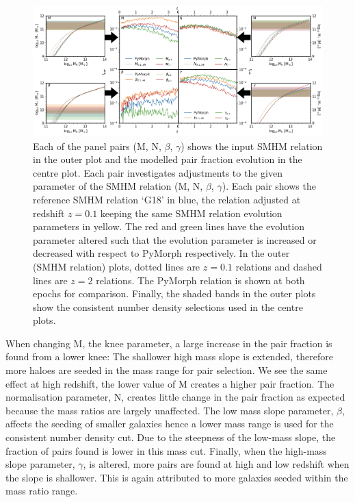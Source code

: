 \begin{landscape}
\begingroup
\begin{figure}[h]
	\centering
	\includegraphics[width = \linewidth]{Figures/Chapter5/PairFractionSystematic.png}
	\caption{Each of the panel pairs (M, N, $\beta$, $\gamma$) shows the input SMHM relation in the outer plot and the modelled pair fraction evolution in the centre plot. Each pair investigates adjustments to the given parameter of the SMHM relation (M, N, $\beta$, $\gamma$). Each pair shows the reference SMHM relation `G18' in blue, the relation adjusted at redshift $z = 0.1$ keeping the same SMHM relation evolution parameters in yellow. The red and green lines have the evolution parameter altered such that the evolution parameter is increased or decreased with respect to PyMorph respectively. In the outer (SMHM relation) plots, dotted lines are $z = 0.1$ relations and dashed lines are $z = 2$ relations. The PyMorph relation is shown at both epochs for comparison. Finally, the shaded bands in the outer plots show the consistent number density selections used in the centre plots.}
	\label{fig:PairFracSystematic}
\end{figure}
\endgroup
\end{landscape}

When changing M, the knee parameter, a large increase in the pair fraction is found from a lower knee: The shallower high mass slope is extended, therefore more haloes are seeded in the mass range for pair selection. 
We see the same effect at high redshift, the lower value of M creates a higher pair fraction. 
The normalisation parameter, N, creates little change in the pair fraction as expected because the mass ratios are largely unaffected. 
The low mass slope parameter, $\beta$, affects the seeding of smaller galaxies hence a lower mass range is used for the consistent number density cut. 
Due to the steepness of the low-mass slope, the fraction of pairs found is lower in this mass cut.
Finally, when the high-mass slope parameter, $\gamma$, is altered, more pairs are found at high and low redshift when the slope is shallower. 
This is again attributed to more galaxies seeded within the mass ratio range.

